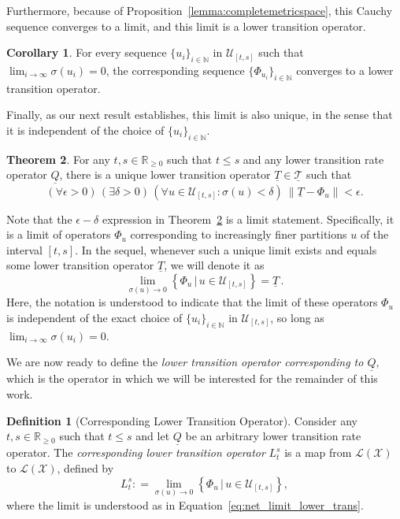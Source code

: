 \documentclass[10pt,a4paper]{paper}
\theoremstyle{definition}
\newtheorem{theorem}{Theorem}[section]
\newtheorem{corollary}[theorem]{Corollary}
\newtheorem{definition}{Definition}
\newcommand{\nats}{\mathbb{N}}
\newcommand{\reals}{\mathbb{R}}
\newcommand{\realsnonneg}{\reals_{\geq 0}}
\newcommand{\states}{\mathcal{X}}
\newcommand{\lt}{\underline{T}}
\newcommand{\lbound}{L}
\newcommand{\gambles}{\mathcal{L}}
\newcommand{\gamblesX}{\gambles(\states)}
\newcommand{\lrate}{\underline{Q}}
\newcommand{\norm}[1]{\left\lVert #1 \right\rVert}
\newcommand{\coloneqq}{:\!=}
\begin{document}
Furthermore, because of Proposition~\ref{lemma:completemetricspace}, this Cauchy sequence converges to a limit, and this limit is a lower transition operator.

\begin{corollary}\label{corol:limitexistsandiscoherent}
For every sequence $\{u_i\}_{i\in\nats}$ in $\mathcal{U}_{[t,s]}$ such that $\lim_{i\to\infty}\sigma(u_i)=0$, the corresponding sequence $\{\Phi_{u_i}\}_{i\in\nats}$ converges to a lower transition operator.
\end{corollary}

Finally, as our next result establishes, this limit is also unique, in the sense that it is independent of the choice of $\{u_i\}_{i\in\nats}$.

\begin{theorem}\label{theo:convergencelowerbound}
For any $t,s\in\realsnonneg$ such that $t\leq s$ and any lower transition rate operator $\lrate$, there is a unique lower transition operator $\lt\in\underline{\mathcal{T}}$ such that 
\begin{equation}\label{eq:theo:convergencelowerbound}
(\forall\epsilon>0)\,
(\exists\delta>0)\,
(\forall u\in\mathcal{U}_{[t,s]}\colon\sigma(u)<\delta)~\norm{\lt - \Phi_u}<\epsilon.
\end{equation}
\end{theorem}

Note that the $\epsilon-\delta$ expression in Theorem~\ref{theo:convergencelowerbound} is a limit statement. Specifically, it is a limit of operators $\Phi_{u}$ corresponding to increasingly finer partitions $u$ of the interval $[t,s]$. In the sequel, whenever such a unique limit exists and equals some lower transition operator $\lt$, we will denote it as
\begin{equation}\label{eq:net_limit_lower_trans}
\lim_{\sigma(u)\to0}\left\{\Phi_u\,\big\vert\,u\in\mathcal{U}_{[t,s]}\right\} = \lt\,.
\end{equation}
Here, the notation is understood to indicate that the limit of these operators $\Phi_{u}$ is independent of the exact choice of $\{u_i\}_{i\in\nats}$ in $\mathcal{U}_{[t,s]}$, so long as $\lim_{i\to\infty}\sigma(u_i)=0$.

We are now ready to define the \emph{lower transition operator corresponding to $\lrate$}, which is the operator in which we will be interested for the remainder of this work.

\begin{definition}[Corresponding Lower Transition Operator]\label{def:low_trans}
Consider any $t,s\in\realsnonneg$ such that $t\leq s$ and let $\lrate$ be an arbitrary lower transition rate operator. The \emph{corresponding lower transition operator} $\lbound_t^s$ is a map from $\gamblesX$ to $\gamblesX$, defined by
\begin{equation}\label{eq:lowerbound}
\lbound_t^s\coloneqq\lim_{\sigma(u)\to0}\left\{ \Phi_u\,\big\vert\,u\in\mathcal{U}_{[t,s]}\right\},
\end{equation}
where the limit is understood as in Equation~\eqref{eq:net_limit_lower_trans}.
\end{definition}
\end{document}
